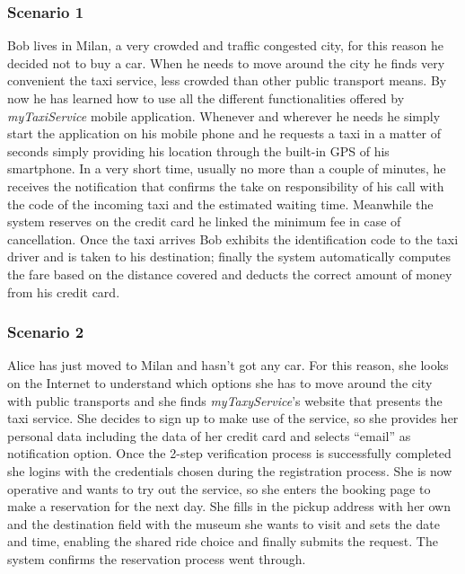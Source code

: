 \documentclass[a4paper,11pt]{report} %
\newcommand{\mts}{\mbox{\normalfont\itshape myTaxiService}}
\begin{document}
	\subsubsection{Scenario 1} Bob lives in Milan, a very crowded and traffic congested city, for this reason he decided not to buy a car. When he needs to move around the city he finds very convenient the taxi service, less crowded than other public transport means. By now he has learned how to use all the different functionalities offered by \mts{} mobile application. Whenever and wherever he needs he simply start the application on his mobile phone and he requests a taxi in a matter of seconds simply providing his location through the built-in GPS of his smartphone. In a very short time, usually no more than a couple of minutes, he receives the notification that confirms the take on responsibility of his call with the code of the incoming taxi and the estimated waiting time. Meanwhile the system reserves on the credit card he linked the minimum fee in case of cancellation. Once the taxi arrives Bob exhibits the identification code to the taxi driver and is taken to his destination; finally the system automatically computes the fare based on the distance covered and deducts the correct amount of money from his credit card. 
	
	\subsubsection{Scenario 2} Alice has just moved to Milan and hasn’t got any car. For this reason, she looks on the Internet to understand which options she has to move around the city with public transports and she finds {\em myTaxyService}'s website that presents the taxi service. She decides to sign up to make use of the service, so she provides her personal data including the data of her credit card and selects ``email'' as notification option. Once the 2-step verification process is successfully completed she logins with the credentials chosen during the registration process. She is now operative and wants to try out the service, so she enters the booking page to make a reservation for the next day. She fills in the pickup address with her own and the destination field with the museum she wants to visit and sets the date and time, enabling the shared ride choice and finally submits the request. The system confirms the reservation process went through. 
	
\end{document}
